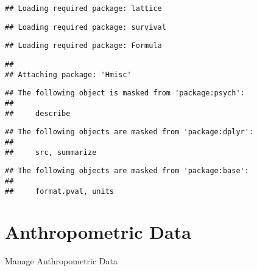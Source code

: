 \documentclass[]{article}
\begin{document}
\begin{verbatim}
## Loading required package: lattice
\end{verbatim}

\begin{verbatim}
## Loading required package: survival
\end{verbatim}

\begin{verbatim}
## Loading required package: Formula
\end{verbatim}

\begin{verbatim}
## 
## Attaching package: 'Hmisc'
\end{verbatim}

\begin{verbatim}
## The following object is masked from 'package:psych':
## 
##     describe
\end{verbatim}

\begin{verbatim}
## The following objects are masked from 'package:dplyr':
## 
##     src, summarize
\end{verbatim}

\begin{verbatim}
## The following objects are masked from 'package:base':
## 
##     format.pval, units
\end{verbatim}

\section{Anthropometric Data}\label{anthropometric-data}

Manage Anthropometric Data
\end{document}
